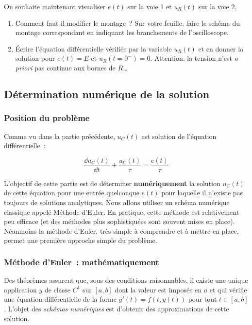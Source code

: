 \documentclass[../main/main.tex]{subfiles}
\begin{document}
On souhaite maintenant visualiser $e(t)$ sur la voie 1 et $u_{R}(t)$ sur la voie
2.

\begin{enumerate}[resume]
	\item Comment faut-il modifier le montage~? Sur votre feuille, faire le
	      schéma du montage correspondant en indiquant les branchements de
	      l'oscilloscope.
	\item Écrire l'équation différentielle vérifiée par la variable $u_{R}(t)$
	      et en donner la solution pour $e(t) = E$ et $u_{R}(t=0^-) = 0$.
	      Attention, la tension n'est \textit{a priori} pas continue aux bornes de
	      $R$…
\end{enumerate}

\subsection{Détermination numérique de la solution}

\subsubsection{Position du problème}

Comme vu dans la partie précédente, $u_{C}(t)$ est solution de l'équation
différentielle~:

\[\frac{\dd u_{C}(t)}{\dd t} + \frac{u_{C}(t)}{\tau} = \frac{e(t)}{\tau}\]

L'objectif de cette partie est de déterminer \textbf{numériquement} la solution
$u_{C}(t)$ de cette équation pour une entrée quelconque $e(t)$ pour laquelle il
n'existe pas toujours de solutions analytiques. Nous allons utiliser un schéma
numérique classique appelé Méthode d'Euler. En pratique, cette méthode est
relativement peu efficace (et des méthodes plus sophistiquées sont souvent mises
en place). Néanmoins la méthode d'Euler, très simple à comprendre et à mettre en
place, permet une première approche simple du problème.

\subsubsection{Méthode d'Euler~: mathématiquement}

Des théorèmes assurent que, sous des conditions raisonnables, il existe une
unique application $y$ de classe $C^1$ sur $[a,b]$ dont la valeur est imposée en
$a$ et qui vérifie une équation différentielle de la forme $y'(t)=f(t,y(t))$
pour tout $t \in [a,b]$. L'objet des \textit{schémas numériques} est d'obtenir
des approximations de cette solution.\bigbreak
\end{document}

